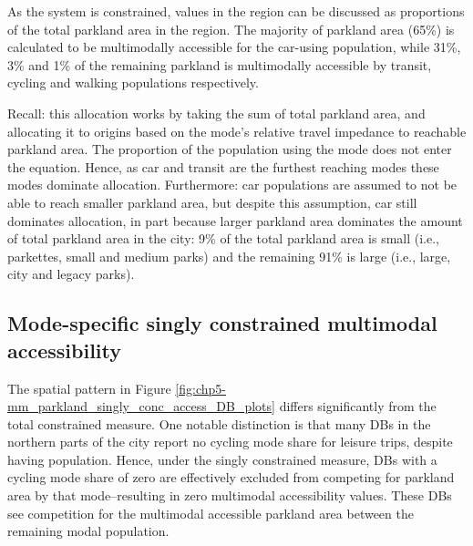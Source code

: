\documentclass[
11pt, %
oneside, %
english, %
singlespacing, %
]{macthesis} %
\begin{document}
As the system is constrained, values in the region can be discussed as proportions of the total parkland area in the region. The majority of parkland area (65\%) is calculated to be multimodally accessible for the car-using population, while 31\%, 3\% and 1\% of the remaining parkland is multimodally accessible by transit, cycling and walking populations respectively.

Recall: this allocation works by taking the sum of total parkland area, and allocating it to origins based on the mode's relative travel impedance to reachable parkland area. The proportion of the population using the mode does not enter the equation. Hence, as car and transit are the furthest reaching modes these modes dominate allocation. Furthermore: car populations are assumed to not be able to reach smaller parkland area, but despite this assumption, car still dominates allocation, in part because larger parkland area dominates the amount of total parkland area in the city: 9\% of the total parkland area is small (i.e., parkettes, small and medium parks) and the remaining 91\% is large (i.e., large, city and legacy parks).

\subsection{Mode-specific singly constrained multimodal accessibility}\label{mode-specific-singly-constrained-multimodal-accessibility}

The spatial pattern in Figure \ref{fig:chp5-mm_parkland_singly_conc_access_DB_plots} differs significantly from the total constrained measure. One notable distinction is that many DBs in the northern parts of the city report no cycling mode share for leisure trips, despite having population. Hence, under the singly constrained measure, DBs with a cycling mode share of zero are effectively excluded from competing for parkland area by that mode--resulting in zero multimodal accessibility values. These DBs see competition for the multimodal accessible parkland area between the remaining modal population.
\end{document}

